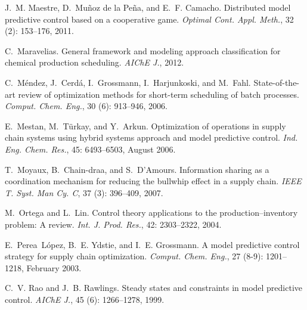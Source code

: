 \documentclass{elsarticle}
\theoremstyle{definition}
\begin{document}
\begin{thebibliography}{28}
J.~M. Maestre, D.~{Mu\~noz de la Pe\~na}, and E.~F. Camacho.
\newblock Distributed model predictive control based on a cooperative game.
\newblock \emph{Optimal Cont. Appl. Meth.}, 32 (2): 153--176,
  2011.

C.~Maravelias.
\newblock General framework and modeling approach classification for chemical
  production scheduling.
\newblock \emph{{AIChE} J.}, 2012.

C.~M{\'e}ndez, J.~Cerd{\'a}, I.~Grossmann, I.~Harjunkoski, and M.~Fahl.
\newblock State-of-the-art review of optimization methods for short-term
  scheduling of batch processes.
\newblock \emph{Comput. Chem. Eng.}, 30 (6): 913--946, 2006.

E.~Mestan, M.~T{\"u}rkay, and Y.~Arkun.
\newblock Optimization of operations in supply chain systems using hybrid
  systems approach and model predictive control.
\newblock \emph{Ind. Eng. Chem. Res.}, 45: 6493--6503, August 2006.

T.~Moyaux, B.~Chain-draa, and S.~D'Amours.
\newblock Information sharing as a coordination mechanism for reducing the
  bullwhip effect in a supply chain.
\newblock \emph{{IEEE} T. Syst. Man Cy. C}, 37 (3): 396--409,
  2007.

M.~Ortega and L.~Lin.
\newblock Control theory applications to the production--inventory problem: {A}
  review.
\newblock \emph{Int. J. Prod. Res.}, 42: 2303--2322, 2004.

E.~Perea~L{\'o}pez, B.~E. Ydstie, and I.~E. Grossmann.
\newblock A model predictive control strategy for supply chain optimization.
\newblock \emph{Comput. Chem. Eng.}, 27 (8-9): 1201--1218,
  February 2003.

C.~V. Rao and J.~B. Rawlings.
\newblock Steady states and constraints in model predictive control.
\newblock \emph{{AIChE} J.}, 45 (6): 1266--1278, 1999.


\end{thebibliography}
\end{document}
